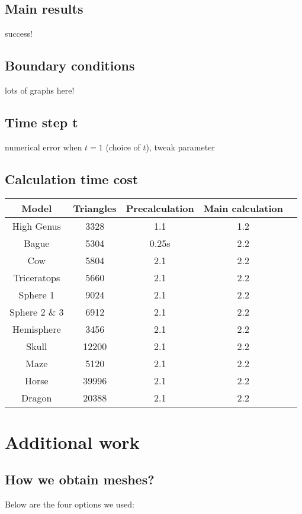 \documentclass[a4paper,12pt,twoside]{article}
\begin{document}
\subsection{Main results}
success!

\subsection{Boundary conditions}
lots of graphs here!

\subsection{Time step t}

numerical error when $t = 1$ (choice of $t$), tweak parameter

\subsection{Calculation time cost}

\begin{tabular}{|c|c|c|c|c|}
  \hline
  Model & Triangles & Precalculation & Main calculation \\
  \hline
  High Genus & 3328 & 1.1 & 1.2 \\
  Bague & 5304 & 0.25s & 2.2 \\
  Cow & 5804 & 2.1 & 2.2 \\
  Triceratops & 5660 & 2.1 & 2.2 \\
  Sphere 1 & 9024 & 2.1 & 2.2 \\
  Sphere 2 \& 3 & 6912 & 2.1 & 2.2 \\
  Hemisphere & 3456 & 2.1 & 2.2 \\
  Skull & 12200 & 2.1 & 2.2 \\
  Maze & 5120 & 2.1 & 2.2 \\
  Horse & 39996 & 2.1 & 2.2 \\
  Dragon & 20388 & 2.1 & 2.2 \\
  \hline
\end{tabular}

\section{Additional work}

\subsection{How we obtain meshes?}
Below are the four options we used:
\end{document}
